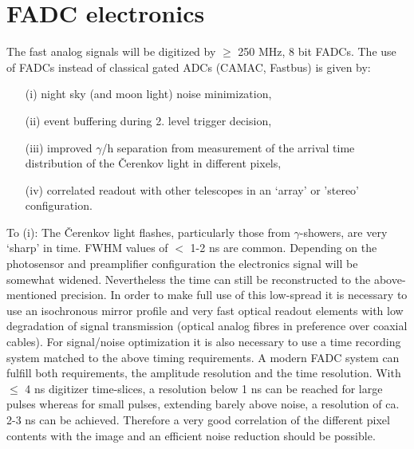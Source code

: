 

\section{FADC electronics}


\medskip The fast analog signals will be digitized by $\geq$ 250 MHz, 8 bit
FADCs. The use of FADCs instead of classical gated ADCs (CAMAC, Fastbus) is
given by:

\begin{itemize}
\item[(i)]  night sky (and moon light) noise minimization,

\item[(ii)]  event buffering during 2. level trigger decision,

\item[(iii)]  improved $\gamma $/h separation from measurement of the
arrival time distribution of the \v {C}erenkov light in different pixels,

\item[(iv)]  correlated readout with other telescopes in an `array' or 'stereo'
configuration.
\end{itemize}

To (i): The \v{C}erenkov light flashes, particularly those from $\gamma$-showers,
are very `sharp' in time. FWHM values of $<$ 1-2 ns are common. 
Depending on the photosensor and preamplifier configuration the electronics
signal will be somewhat widened. Nevertheless the time can still be reconstructed
to the above-mentioned precision.
In order to
make full use of this low-spread it is necessary to use an isochronous
mirror profile and very fast optical readout elements with low degradation
of signal transmission (optical analog fibres in preference over
coaxial cables). For signal/noise optimization it is also necessary to use a
time recording system matched to the above timing requirements. A modern
FADC system can fulfill both requirements, the amplitude resolution and the
time resolution. With $\leq$ 4 ns digitizer time-slices, a resolution below
1 ns can be reached for large pulses whereas for small pulses, extending
barely above noise, a resolution of ca. 2-3 ns can be achieved. Therefore a
very good correlation of the different pixel contents with the image and an
efficient noise reduction should be possible.

